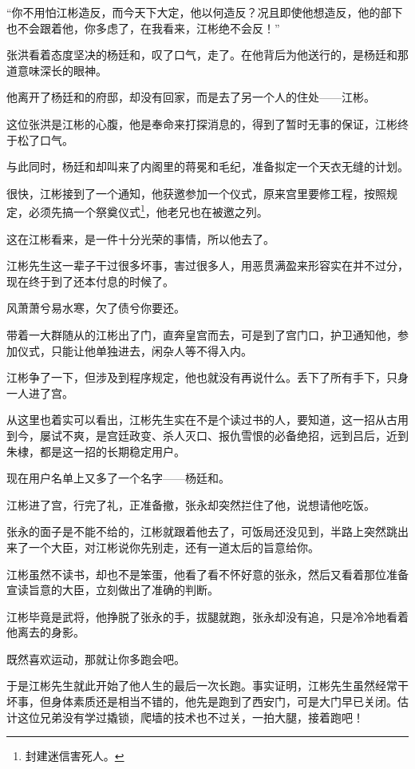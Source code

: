 \begin{multicols}{\theparacolNo}
		“你不用怕江彬造反，而今天下大定，他以何造反？况且即使他想造反，他的部下也不会跟着他，你多虑了，在我看来，江彬绝不会反！”

		张洪看着态度坚决的杨廷和，叹了口气，走了。在他背后为他送行的，是杨廷和那道意味深长的眼神。

		他离开了杨廷和的府邸，却没有回家，而是去了另一个人的住处——江彬。

		这位张洪是江彬的心腹，他是奉命来打探消息的，得到了暂时无事的保证，江彬终于松了口气。

		与此同时，杨廷和却叫来了内阁里的蒋冕和毛纪，准备拟定一个天衣无缝的计划。

		很快，江彬接到了一个通知，他获邀参加一个仪式，原来宫里要修工程，按照规定，必须先搞一个祭奠仪式\footnote{封建迷信害死人。}，他老兄也在被邀之列。

		这在江彬看来，是一件十分光荣的事情，所以他去了。

		江彬先生这一辈子干过很多坏事，害过很多人，用恶贯满盈来形容实在并不过分，现在终于到了还本付息的时候了。

		风萧萧兮易水寒，欠了债兮你要还。

		带着一大群随从的江彬出了门，直奔皇宫而去，可是到了宫门口，护卫通知他，参加仪式，只能让他单独进去，闲杂人等不得入内。

		江彬争了一下，但涉及到程序规定，他也就没有再说什么。丢下了所有手下，只身一人进了宫。

		从这里也着实可以看出，江彬先生实在不是个读过书的人，要知道，这一招从古用到今，屡试不爽，是宫廷政变、杀人灭口、报仇雪恨的必备绝招，远到吕后，近到朱棣，都是这一招的长期稳定用户。

		现在用户名单上又多了一个名字——杨廷和。

		江彬进了宫，行完了礼，正准备撤，张永却突然拦住了他，说想请他吃饭。

		张永的面子是不能不给的，江彬就跟着他去了，可饭局还没见到，半路上突然跳出来了一个大臣，对江彬说你先别走，还有一道太后的旨意给你。

		江彬虽然不读书，却也不是笨蛋，他看了看不怀好意的张永，然后又看着那位准备宣读旨意的大臣，立刻做出了准确的判断。

		江彬毕竟是武将，他挣脱了张永的手，拔腿就跑，张永却没有追，只是冷冷地看着他离去的身影。

		既然喜欢运动，那就让你多跑会吧。

		于是江彬先生就此开始了他人生的最后一次长跑。事实证明，江彬先生虽然经常干坏事，但身体素质还是相当不错的，他先是跑到了西安门，可是大门早已关闭。估计这位兄弟没有学过撬锁，爬墙的技术也不过关，一拍大腿，接着跑吧！


\end{multicols}
